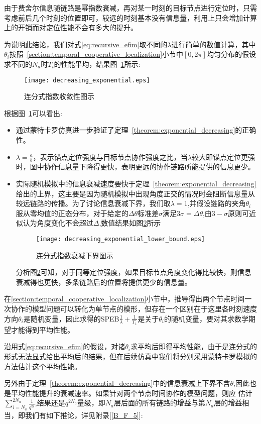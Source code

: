\begin{remark}
由于费舍尔信息随链路是幂指数衰减，再对某一时刻的目标节点进行定位时，只需考虑前后几个时刻的位置即可，较远的时刻基本没有信息量，利用上只会增加计算上的开销而对定位性能不会有多大的提升。

为说明此结论，我们对式\ref{eq:recursive_efim}取不同的$\lambda$进行简单的数值计算，其中$\theta_i$按照~\ref{section:temporal_cooperative_localization}小节中$[0,2\pi]$均匀分布的假设求不同的$N_a$时$T_i$的性能平均，结果图~\ref{fig:continuous_fraction_exponential}所示:
\begin{figure}
  \centering
  \texttt{[image: decreasing\_exponential.eps]}
  \caption{连分式指数收敛性图示}\label{fig:continuous_fraction_exponential}
\end{figure}
根据图~\ref{fig:continuous_fraction_exponential}可以看出:
\begin{itemize}
\item 通过蒙特卡罗仿真进一步验证了定理~\ref{theorem:exponential_decreasing}的正确性。
\item $\lambda=\frac{a}{b}$，表示锚点定位强度与目标节点协作强度之比，当$\lambda$较大即锚点定位更强时，图中协作信息量下降得更快，表明更远的协作链路所能提供的信息更少。
\item 实际随机模拟中的信息衰减速度要快于定理~\ref{theorem:exponential_decreasing}给出的上界，这主要是因为随机模拟中出现角度正交的情况时会阻断信息量从较远链路的传播。为了讨论信息衰减下界，我们取$\lambda=1$,并假设链路的夹角$\theta_i$服从零均值的正态分布，对于给定的$\Delta \theta$标准差$\sigma$满足$3\sigma=\Delta \theta$,由$3-\sigma$原则可近似认为角度变化不会超过$\Delta$,数值结果如图\ref{fig:continuous_fraction_exponential_lower_bound}所示
    \begin{figure}
      \centering
      \texttt{[image: decreasing\_exponential\_lower\_bound.eps]}
      \caption{连分式指数衰减下界图示}\label{fig:continuous_fraction_exponential_lower_bound}
    \end{figure}

    分析图\ref{fig:continuous_fraction_exponential_lower_bound}可知，对于同等定位强度，如果目标节点角度变化得比较快，则信息衰减得也更快，多条链路后的位置将提供更少的信息量。
\end{itemize}
\end{remark}
\begin{remark}
在\ref{section:temporal_cooperative_localization}小节中，推导得出两个节点时间一次协作的模型问题可以转化为单节点的模形，但存在一个区别在于这里各时刻速度方向$\theta_i$是随机变量，因此求得的SPEB$\frac{1}{\lambda}+\frac{1}{T_1}$是关于$\theta_i$的随机变量，要对其求数学期望才能得到平均性能。

沿用式\ref{eq:recursive_efim}的假设，对诸$\theta_i$求平均后即得平均性能，由于是连分式的形式无法显式给出平均后的结果，但在后续仿真中我们将分别采用蒙特卡罗模拟的方法估计这个平均性能。

另外由于定理~\ref{theorem:exponential_decreasing}中的信息衰减上下界不含$\theta$,因此也是平均性能提升的衰减速率。如果针对两个节点时间协作的模型问题，则应
估计$\sum_{i=N_a}^{2N_a}\frac{1}{q^{2i}}$,结果还是$q^{2N_a}$量级，即$N_a$层后面的所有链路的增益与第$N_a$层的增益相当，即我们有如下推论，详见附录[\ref{B_F_5}]:
\end{remark}
